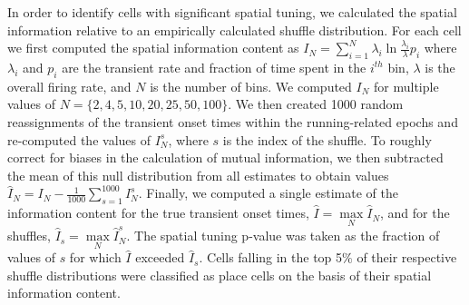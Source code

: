 In order to identify cells with significant spatial tuning, we calculated the spatial information relative to an empirically calculated shuffle distribution. For each cell we first computed the spatial information content \citep{Skaggs1993} as $I_N = \sum^N_{i=1}\lambda_i \ln\frac{\lambda_i}{\lambda}p_i$ where $\lambda_i$ and $p_i$ are the transient rate and fraction of time spent in the $i^{th}$ bin, $\lambda$ is the overall firing rate, and $N$ is the number of bins. We computed $I_N$ for multiple values of $N = \{2, 4, 5, 10, 20, 25, 50, 100\}$. We then created 1000 random reassignments of the transient onset times within the running-related epochs and re-computed the values of $I^s_N$, where $s$ is the index of the shuffle. To roughly correct for biases in the calculation of mutual information, we then subtracted the mean of this null distribution from all estimates to obtain values $\hat{I}_N = I_N - \frac{1}{1000}\sum^{1000}_{s=1}I^s_N$.  Finally, we computed a single estimate of the information content for the true transient onset times, $\hat{I} = \max\limits_N{\hat{I}_N}$, and for the shuffles, $\hat{I}_s = \max\limits_N{\hat{I}_N^s}$.  The spatial tuning p-value was taken as the fraction of values of $s$ for which $\hat{I}$ exceeded $\hat{I}_s$. Cells falling in the top 5$\%$ of their respective shuffle distributions were classified as place cells on the basis of their spatial information content.

